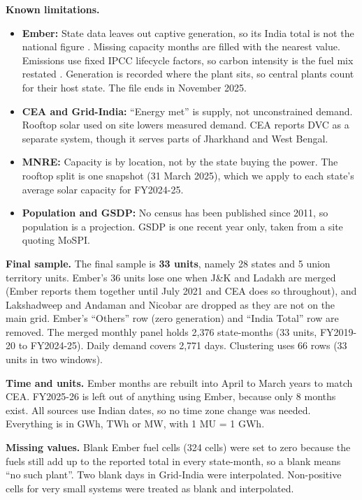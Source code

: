 \documentclass[10pt,a4paper]{article}
\makeatletter
\renewcommand{\section}{\@startsection{section}{1}{0pt}{12pt plus 2pt}{5pt}{\large\bfseries}}
\makeatother
\begin{document}
\textbf{Known limitations.}
\begin{itemize}
\item \textbf{Ember:} State data leaves out captive generation, so its India total is not the national figure \cite{embermeth}. Missing capacity months are filled with the nearest value. Emissions use fixed IPCC lifecycle factors, so carbon intensity is the fuel mix restated \cite{embermeth,ipcc}. Generation is recorded where the plant sits, so central plants count for their host state. The file ends in November 2025.
\item \textbf{CEA and Grid-India:} ``Energy met'' is supply, not unconstrained demand. Rooftop solar used on site lowers measured demand. CEA reports DVC as a separate system, though it serves parts of Jharkhand and West Bengal.
\item \textbf{MNRE:} Capacity is by location, not by the state buying the power. The rooftop split is one snapshot (31 March 2025), which we apply to each state's average solar capacity for FY2024-25.
\item \textbf{Population and GSDP:} No census has been published since 2011, so population is a projection. GSDP is one recent year only, taken from a site quoting MoSPI.
\end{itemize}

\section{3. Data preparation}
\textbf{Final sample.} The final sample is \textbf{33 units}, namely 28 states and 5 union territory units. Ember's 36 units lose one when J\&K and Ladakh are merged (Ember reports them together until July 2021 and CEA does so throughout), and Lakshadweep and Andaman and Nicobar are dropped as they are not on the main grid. Ember's ``Others'' row (zero generation) and ``India Total'' row are removed. The merged monthly panel holds 2,376 state-months (33 units, FY2019-20 to FY2024-25). Daily demand covers 2,771 days. Clustering uses 66 rows (33 units in two windows).

\textbf{Time and units.} Ember months are rebuilt into April to March years to match CEA. FY2025-26 is left out of anything using Ember, because only 8 months exist. All sources use Indian dates, so no time zone change was needed. Everything is in GWh, TWh or MW, with 1 MU = 1 GWh.

\textbf{Missing values.} Blank Ember fuel cells (324 cells) were set to zero because the fuels still add up to the reported total in every state-month, so a blank means ``no such plant''. Two blank days in Grid-India were interpolated. Non-positive cells for very small systems were treated as blank and interpolated.
\end{document}
